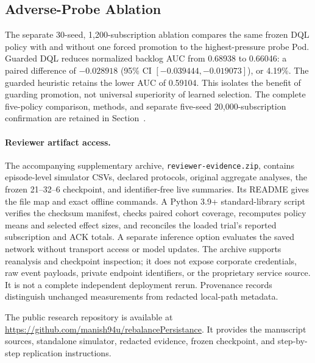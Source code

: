\subsection{Adverse-Probe Ablation}
The separate 30-seed, 1,200-subscription ablation compares the same frozen DQL
policy with and without one forced promotion to the highest-pressure probe
Pod. Guarded DQL reduces normalized backlog AUC from 0.68938 to 0.66046:
a paired difference of $-0.028918$ (95\% CI $[-0.039444,-0.019073]$), or 4.19\%.
The guarded heuristic retains the lower AUC of 0.59104. This isolates the
benefit of guarding promotion, not universal superiority of learned selection.
The complete five-policy comparison, methods, and separate five-seed
20,000-subscription confirmation are retained in
Section~.
\paragraph{Reviewer artifact access.}
The accompanying supplementary archive, \texttt{reviewer-evidence.zip},
contains episode-level simulator CSVs, declared protocols, original aggregate
analyses, the frozen 21--32--6 checkpoint, and identifier-free live summaries.
Its README gives the file map and exact offline commands. A Python 3.9+
standard-library script verifies the checksum manifest, checks paired cohort
coverage, recomputes policy means and selected effect sizes, and reconciles
the loaded trial's reported subscription and ACK totals. A separate inference
option evaluates the saved network without transport access or model updates.
The archive supports reanalysis and checkpoint inspection; it does not expose
corporate credentials, raw event payloads, private endpoint identifiers, or
the proprietary service source. It is not a complete independent deployment
rerun. Provenance records distinguish unchanged measurements from redacted
local-path metadata.

The public research repository is available at
\url{https://github.com/manish94u/rebalancePersistance}.
It provides the manuscript sources, standalone simulator, redacted evidence,
frozen checkpoint, and step-by-step replication instructions.
